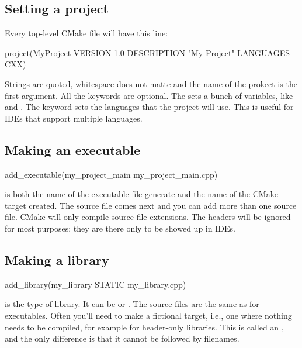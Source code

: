 \subsection{Setting a project}
Every top-level CMake file will have this line:
\begin{neonlisting}[language=C++]{}
    project(MyProject VERSION 1.0
        DESCRIPTION "My Project"
        LANGUAGES CXX)

\end{neonlisting}

Strings are quoted, whitespace does not matte and the name of the prokect is the first argument.
All the keywords are optional. The  sets a bunch of variables, like  
and . The  keyword sets the languages that the project will use. This is useful for IDEs that support multiple languages.

\subsection{Making an executable}

\begin{neonlisting}[language=C++]{}
add_executable(my_project_main my_project_main.cpp)
\end{neonlisting}

 is both the name of the executable file generate and the name of the CMake target created.
The source file comes next and you can add more than one source file. CMake will only compile source file extensions. 
The headers will be ignored for most purposes; they are there only to be showed up in IDEs.

\subsection{Making a library}

\begin{neonlisting}[language=C++]{}
add_library(my_library STATIC my_library.cpp)
\end{neonlisting}

 is the type of library. It can be  or . The source files are the same as for executables.
Often you'll need to make a fictional target, i.e., one where nothing needs to be compiled, for example for header-only libraries. This is called an ,
and the only difference is that it cannot be followed by filenames.

